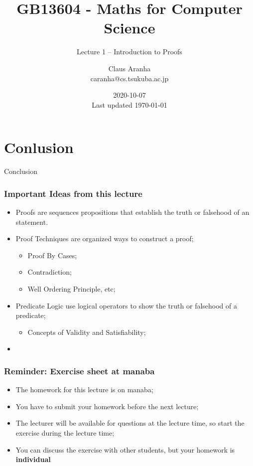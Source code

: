 \documentclass{beamer}
\title[GB13604]{GB13604 - Maths for Computer Science}
\subtitle[]{Lecture 1 -- Introduction to Proofs}
\author[Claus Aranha]{Claus Aranha\\{\footnotesize caranha@cs.tsukuba.ac.jp}}
\institute[COINS]{College of Information Science}
\date[2020-10-07]{2020-10-07\\{\tiny Last updated \today}}
\begin{document}
\begin{frame}
  \maketitle
\end{frame}






\section{Conlusion}

\begin{frame}
  \begin{center}
    Conclusion
  \end{center}
\end{frame}

\begin{frame}
  \frametitle{Important Ideas from this lecture}
  \begin{itemize}
  \item Proofs are sequences propositions that establish the truth or falsehood of an statement.
  \item Proof Techniques are organized ways to construct a proof;
  \begin{itemize}
    \item Proof By Cases;
    \item Contradiction;
    \item Well Ordering Principle, etc;
  \end{itemize}
  \item Predicate Logic use logical operators to show the truth or falsehood of a predicate;
  \begin{itemize}
    \item Concepts of Validity and Satisfiability;
  \end{itemize}
  \item {}
  \end{itemize}
\end{frame}

\begin{frame}
  \frametitle{Reminder: Exercise sheet at manaba}

  \begin{itemize}
    \item The homework for this lecture is on manaba;
    \item You have to submit your homework before the next lecture;
    \item The lecturer will be available for questions at the lecture time, so start the exercise during the lecture time;
    \item You can discuss the exercise with other students, but your homework is {\bf individual}
  \end{itemize}
\end{frame}


\end{document}
